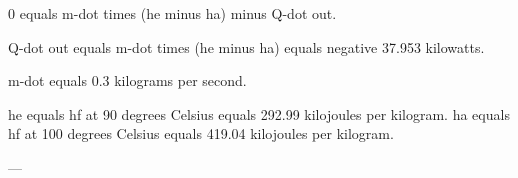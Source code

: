 0 equals m-dot times (he minus ha) minus Q-dot out.  

Q-dot out equals m-dot times (he minus ha) equals negative 37.953 kilowatts.  

m-dot equals 0.3 kilograms per second.  

he equals hf at 90 degrees Celsius equals 292.99 kilojoules per kilogram.  
ha equals hf at 100 degrees Celsius equals 419.04 kilojoules per kilogram.  

---